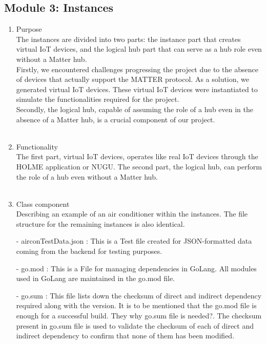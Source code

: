 \documentclass[conference]{IEEEtran}
\begin{document}
\subsection{Module 3: Instances}
\begin{enumerate}
    \item Purpose\\
    The instances are divided into two parts: the instance part that creates virtual IoT devices, and the logical hub part that can serve as a hub role even without a Matter hub.\\
Firstly, we encountered challenges progressing the project due to the absence of devices that actually support the MATTER protocol. As a solution, we generated virtual IoT devices. These virtual IoT devices were instantiated to simulate the functionalities required for the project.\\
Secondly, the logical hub, capable of assuming the role of a hub even in the absence of a Matter hub, is a crucial component of our project.\\ \\
    \item Functionality\\
    The first part, virtual IoT devices, operates like real IoT devices through the HOLME application or NUGU. The second part, the logical hub, can perform the role of a hub even without a Matter hub. \\ \\
    \item Class component\\
    Describing an example of an air conditioner within the instances. The file structure for the remaining instances is also identical.\\
        \item[-] airconTestData.json : This is a Test file created for JSON-formatted data coming from the backend for testing purposes.\\
        \item[-]  go.mod : This is a File for managing dependencies in GoLang. All modules used in GoLang are maintained in the go.mod file.\\
        \item[-] go.sum : This file lists down the checksum of direct and indirect dependency required along with the version. It is to be mentioned that the go.mod file is enough for a successful build. They why go.sum file is needed?. The checksum present in go.sum file is used to validate the checksum of each of direct and indirect dependency to confirm that none of them has been modified. \\

\end{enumerate}
\end{document}
